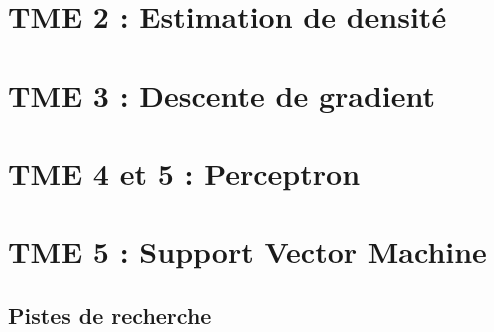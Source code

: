 \documentclass[a4paper,12pt]{article}
\begin{document}
\section{TME 2 : Estimation de densité}

\section{TME 3 : Descente de gradient}

\section{TME 4 et 5 : Perceptron}

\section{TME 5 : Support Vector Machine}


\subsection{Pistes de recherche}
\end{document}
